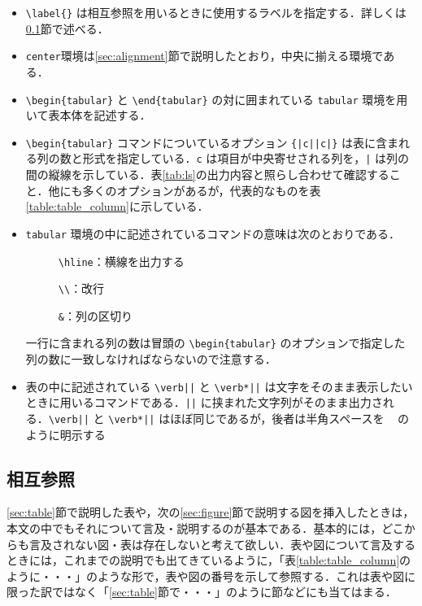 \begin{itemize}
    \item \verb|\label{}| は相互参照を用いるときに使用するラベルを指定する．詳しくは\ref{sec:cross_reference}節で述べる．
    \item \verb|center|環境は\ref{sec:alignment}節で説明したとおり，中央に揃える環境である．
    \item \verb|\begin{tabular}| と \verb|\end{tabular}| の対に囲まれている \verb|tabular| 環境を用いて表本体を記述する．

    \item \verb|\begin{tabular}| コマンドについているオプション \verb+{|c||c|}+ は表に含まれる列の数と形式を指定している．\verb|c| は項目が中央寄せされる列を，\verb+|+ は列の間の縦線を示している．表\ref{tab:ls}の出力内容と照らし合わせて確認すること．他にも多くのオプションがあるが，代表的なものを表\ref{table:table_column}に示している．
    \item \verb|tabular| 環境の中に記述されているコマンドの意味は次のとおりである．
    \begin{description}
        \item[] \verb+\hline+：横線を出力する
        \item[] \verb+\\+：改行
        \item[] \verb+&+：列の区切り
    \end{description}
    一行に含まれる列の数は冒頭の \verb+\begin{tabular}+ のオプションで指定した列の数に一致しなければならないので注意する．

    \item 表の中に記述されている \verb+\verb||+ と \verb+\verb*||+ は文字をそのまま表示したいときに用いるコマンドである．\verb+||+ に挟まれた文字列がそのまま出力される．\verb+\verb||+ と \verb+\verb*||+ はほぼ同じであるが，後者は半角スペースを \verb*+ + のように明示する

\end{itemize}

\subsection{相互参照}
\label{sec:cross_reference}

\ref{sec:table}節で説明した表や，次の\ref{sec:figure}節で説明する図を挿入したときは，本文の中でもそれについて言及・説明するのが基本である．基本的には，どこからも言及されない図・表は存在しないと考えて欲しい．表や図について言及するときには，これまでの説明でも出てきているように，「表\ref{table:table_column}のように・・・」のような形で，表や図の番号を示して参照する．これは表や図に限った訳ではなく「\ref{sec:table}節で・・・」のように節などにも当てはまる．


